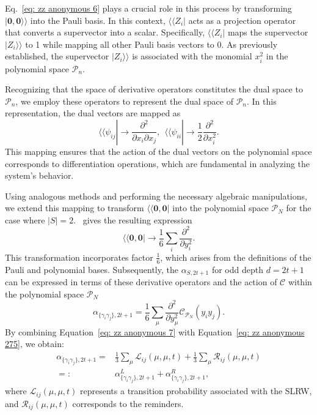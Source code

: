 \documentclass[showpacs,twocolumn,aps,prx,long bibliography,superscriptaddress,notitlepage]{revtex4-1}
\newcommand{\supket}[1]{|#1 \rangle\rangle}
\newcommand{\supbra}[1]{\langle\langle #1 |}
\begin{document}
Eq.~\eqref{eq: zz anonymous 6} plays a crucial role in this process by transforming \(\supket{\bm{0}, \bm{0}}\) into the Pauli basis. In this context, \(\supbra{Z_i}\) acts as a projection operator that converts a supervector into a scalar. Specifically, \(\supbra{Z_i}\) maps the supervector \(\supket{Z_i}\) to 1 while mapping all other Pauli basis vectors to 0. As previously established, the supervector \(\supket{Z_i}\) is associated with the monomial \(x_i^2\) in the polynomial space \(\mathcal{P}_n\).

Recognizing that the space of derivative operators constitutes the dual space to \(\mathcal{P}_n\), we employ these operators to represent the dual space of \(\mathcal{P}_n\). In this representation, the dual vectors are mapped as 
\begin{equation}
    \supbra{\psi_{ij}} \to \frac{\partial^2}{\partial x_i \partial x_j},~~\supbra{\psi_{ii}}\to \frac{1}{2}\frac{\partial^2}{\partial x_i^2}.
\end{equation}
This mapping ensures that the action of the dual vectors on the polynomial space corresponds to differentiation operations, which are fundamental in analyzing the system's behavior.

Using analogous methods and performing the necessary algebraic manipulations, we extend this mapping to transform \(\supbra{\bm{0}, \bm{0}}\) into the polynomial space \(\mathcal{P}_N\) for the case where \(|S| = 2\). \ gives the resulting expression \begin{equation}
    \supbra{\bm 0,\bm 0} \to \frac{1}{6} \sum_{i} \frac{\partial^2}{\partial y_i^2 }.
\end{equation}
This transformation incorporates factor \(\frac{1}{6}\), which arises from the definitions of the Pauli and polynomial bases. Subsequently, the \(\alpha_{S,2t+1}\) for odd depth \(d = 2t + 1\) can be expressed in terms of these derivative operators and the action of \(\mathcal{C}\) within the polynomial space \(\mathcal{P}_N\)
\begin{equation}
    \alpha_{\{\gamma_i\gamma_j\},2t+1} = \frac{1}{6} \sum_{\mu} \frac{\partial^2}{\partial y_\mu^2 } \mathcal{C}_{\mathcal{P}_N} (y_i y_j).
    \label{eq: zz anonymous 275}
\end{equation}
By combining Equation~\eqref{eq: zz anonymous 7} with Equation~\eqref{eq: zz anonymous 275}, we obtain:
\begin{align}
    \alpha_{\{\gamma_i\gamma_j\},2t+1} =& \frac{1}{3} \sum_\mu \mathscr{L}_{ij} (\mu, \mu, t) + \frac{1}{3} \sum_\mu \mathscr{R}_{ij} (\mu, \mu, t) \\
    =:&  \alpha_{\{\gamma_i\gamma_j\}, 2t+1}^{L} + \alpha_{\{\gamma_i\gamma_j\}, 2t+1}^{R},
    \label{eq: zz anonymous 24}
\end{align}
where \(\mathscr{L}_{ij} (\mu, \mu, t)\) represents a transition probability associated with the SLRW, and \(\mathscr{R}_{ij} (\mu, \mu, t)\) corresponds to the reminders. 
\end{document}
